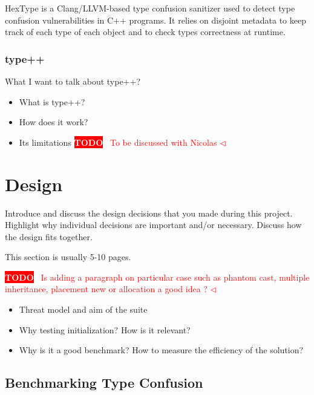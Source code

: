\documentclass[a4paper,11pt,oneside]{report}
\newcommand{\todobox}[3]{%
       \colorbox{#1}{\textcolor{white}{\sffamily\bfseries\scriptsize #2}}%
       ~\textcolor{#1}{#3} %
       \textcolor{#1}{$\triangleleft$}%
}
\newcommand{\adrbqt}[1]{\todobox{red}{TODO}{#1}}
\begin{document}
HexType is a Clang/LLVM-based type confusion sanitizer used to detect type confusion vulnerabilities in C++ programs. 
It relies on disjoint metadata to keep track of each type of each object and to check types correctness at runtime.

\subsection{type++}

What I want to talk about type++?
\begin{itemize}
       \item What is type++?
       \item How does it work?
       \item Its limitations \adrbqt{To be discussed with Nicolas}
\end{itemize}


\chapter{Design}

Introduce and discuss the design decisions that you made during this project.
Highlight why individual decisions are important and/or necessary. Discuss
how the design fits together.

This section is usually 5-10 pages.

\adrbqt{Is adding a paragraph on particular case such as phantom cast, multiple inheritance, placement new or allocation a good idea ?}

\begin{itemize}
       \item Threat model and aim of the suite 
       \item Why testing initialization? How is it relevant?
       \item Why is it a good benchmark? How to measure the efficiency of the solution?

\end{itemize}

\section{Benchmarking Type Confusion}
\end{document}
